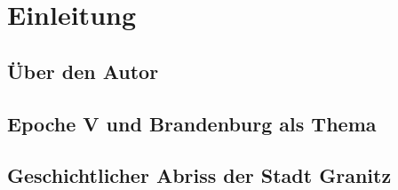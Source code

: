 \section{Einleitung}
\label{sec:introduction}

\subsection{\"Uber den Autor}
\label{sec:author}




\subsection{Epoche V und Brandenburg als Thema}
\label{sec:theme}



\subsection{Geschichtlicher Abriss der Stadt Granitz}
\label{sec:storyOfGranitz}